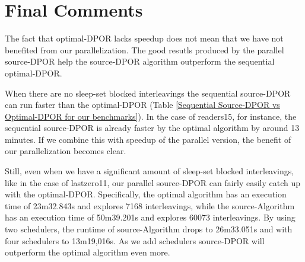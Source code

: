\section{Final Comments}

The fact that optimal-DPOR lacks speedup does not mean that we have not benefited from our parallelization. 
The good resutls produced by the parallel source-DPOR help the source-DPOR algorithm outperform the sequential optimal-DPOR.

When there are no sleep-set blocked interleavings the sequential source-DPOR
can run faster than the optimal-DPOR (Table \ref{Sequential Source-DPOR vs Optimal-DPOR for our benchmarks}). 
In the case of readers15, for instance, the sequential source-DPOR is already faster by the optimal algorithm by
around 13 minutes. If we combine this with speedup of the parallel version, the benefit of our parallelization becomes clear.

Still, even when we have a significant amount of sleep-set blocked interleavings, like in the case of lastzero11, our parallel
source-DPOR can fairly easily catch up with the optimal-DPOR. Specifically, the optimal algorithm has an execution time of 23m32.843s
and explores 7168 interleavings, while the source-Algorithm has an execution time of 50m39.201s and explores 60073 interleavings.
By using two schedulers, the runtime of source-Algorithm drops to 26m33.051s and with four schedulers to 13m19,016s. As we add
schedulers source-DPOR will outperform the optimal algorithm even more.

